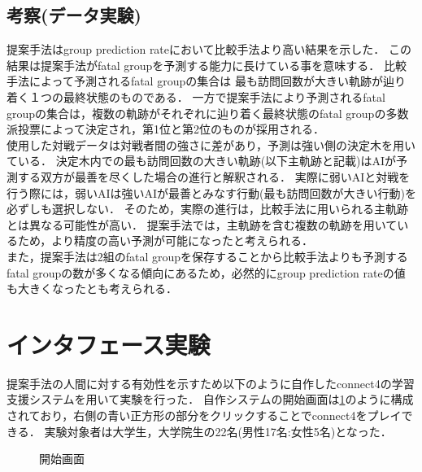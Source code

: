 \subsection{考察(データ実験)}
提案手法はgroup prediction rateにおいて比較手法より高い結果を示した．
この結果は提案手法がfatal groupを予測する能力に長けている事を意味する．
比較手法によって予測されるfatal groupの集合は
最も訪問回数が大きい軌跡が辿り着く１つの最終状態のものである．
一方で提案手法により予測されるfatal groupの集合は，複数の軌跡がそれぞれに辿り着く最終状態のfatal groupの多数派投票によって決定され，第1位と第2位のものが採用される．\\
使用した対戦データは対戦者間の強さに差があり，予測は強い側の決定木を用いている．
決定木内での最も訪問回数の大きい軌跡(以下主軌跡と記載)はAIが予測する双方が最善を尽くした場合の進行と解釈される．
実際に弱いAIと対戦を行う際には，弱いAIは強いAIが最善とみなす行動(最も訪問回数が大きい行動)を必ずしも選択しない．
そのため，実際の進行は，比較手法に用いられる主軌跡とは異なる可能性が高い．
提案手法では，主軌跡を含む複数の軌跡を用いているため，より精度の高い予測が可能になったと考えられる．\\
また，提案手法は2組のfatal groupを保存することから比較手法よりも予測するfatal groupの数が多くなる傾向にあるため，必然的にgroup prediction rateの値も大きくなったとも考えられる．


\section{インタフェース実験}
提案手法の人間に対する有効性を示すため以下のように自作したconnect4の学習支援システムを用いて実験を行った．
自作システムの開始画面は\ref{fig:basic}のように構成されており，右側の青い正方形の部分をクリックすることでconnect4をプレイできる．
実験対象者は大学生，大学院生の22名(男性17名:女性5名)となった．
\begin{figure}[t]
    \centering
    \setlength{\fboxsep}{1pt} %
    \setlength{\fboxrule}{1pt} %
    \caption{開始画面}
    \label{fig:basic}
\end{figure}

